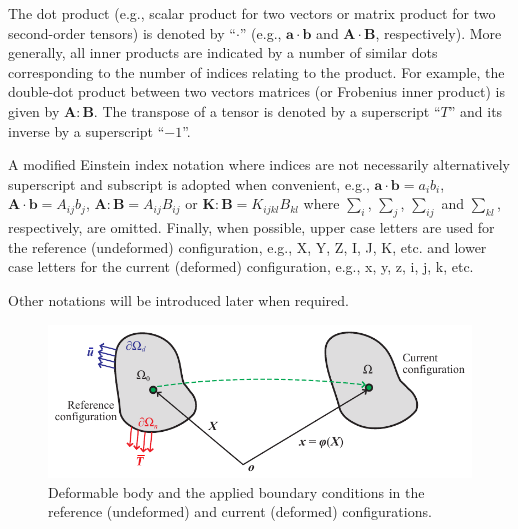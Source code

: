 \documentclass[oneside,11pt,times]{book}
\begin{document}
The dot product (e.g., scalar product for two vectors or matrix product for two second-order tensors) is denoted by ``$\cdot$'' (e.g., $\bm{a} \cdot \bm{b}$ and $\bm{A} \cdot \bm{B}$, respectively). More generally, all inner products are indicated by a number of similar dots corresponding to the number of indices relating to the product. For example, the double-dot product between two vectors matrices (or Frobenius inner product) is given by $\bm{A} : \bm{B}$. The transpose of a tensor is denoted by a superscript ``$T$'' and its inverse by a superscript ``$-1$''.


A modified Einstein index notation where indices are not necessarily alternatively superscript and subscript is adopted when convenient, e.g., $\bm{a}\cdot\bm{b}=a_i b_i$, $\bm{A}\cdot \bm{b}=A_{ij} b_j$, $\bm{A}:\bm{B}=A_{ij} B_{ij}$ or $\bm{K}:\bm{B}=K_{ijkl}B_{kl}$ where $\sum_i$, $\sum_j$, $\sum_{ij}$ and $\sum_{kl}$, respectively, are omitted.  Finally, when possible, upper case letters are used for the reference (undeformed) configuration, e.g., X, Y, Z, I, J, K, etc. and lower case letters for the current (deformed) configuration, e.g., x, y, z, i, j, k, etc.

Other notations will be introduced later when required.

\begin{figure}[h!]
    \centering
     \includegraphics[scale=1.0]{imgs/SpatialDiscretisation/BodyAndConfigurations.pdf}
     \caption{Deformable body and the applied boundary conditions in the reference (undeformed) and current (deformed) configurations.}
     \label{figureBodyConfiguration}
\end{figure}
\end{document}
